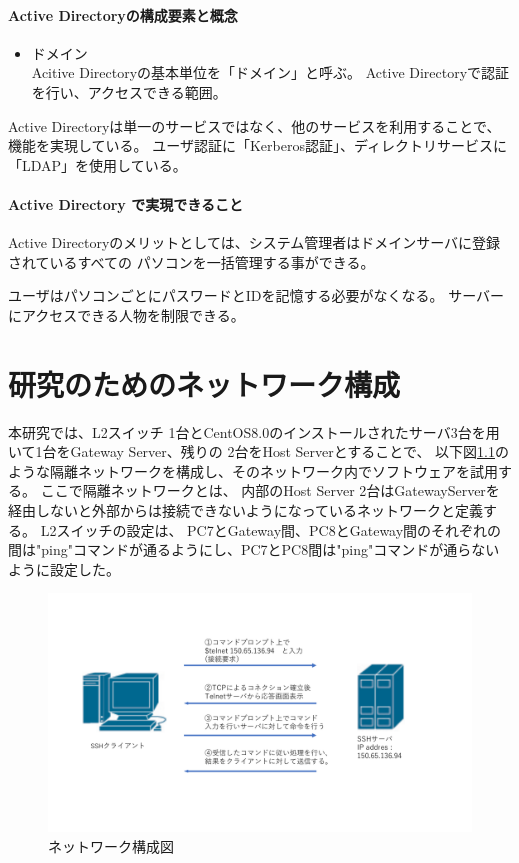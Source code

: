 \documentclass[11pt,a4j,titlepage]{jreport}
\begin{document}

\subsubsection*{Active Directoryの構成要素と概念}

\begin{itemize}
    \item ドメイン\mbox{}\\
    Acitive Directoryの基本単位を「ドメイン」と呼ぶ。
    Active Directoryで認証を行い、アクセスできる範囲。

\end{itemize}
Active Directoryは単一のサービスではなく、他のサービスを利用することで、機能を実現している。
ユーザ認証に「Kerberos認証」、ディレクトリサービスに「LDAP」を使用している。


\subsubsection*{Active Directory で実現できること}
Active Directoryのメリットとしては、システム管理者はドメインサーバに登録されているすべての
パソコンを一括管理する事ができる。

ユーザはパソコンごとにパスワードとIDを記憶する必要がなくなる。
サーバーにアクセスできる人物を制限できる。


\fi


\chapter{研究のためのネットワーク構成}
本研究では、L2スイッチ 1台とCentOS8.0のインストールされたサーバ3台を用いて1台をGateway Server、残りの
2台をHost Serverとすることで、
以下図\ref{network_graph}のような隔離ネットワークを構成し、そのネットワーク内でソフトウェアを試用する。
ここで隔離ネットワークとは、
内部のHost Server 2台はGatewayServerを経由しないと外部からは接続できないようになっているネットワークと定義する。
L2スイッチの設定は、
PC7とGateway間、PC8とGateway間のそれぞれの間は"ping"コマンドが通るようにし、PC7とPC8間は"ping"コマンドが通らないように設定した。

\begin{figure}[H]
    \centering
    \includegraphics*[width=1.0\textwidth,page=2]{graphs/network_archtecture.pdf}
    \caption{ネットワーク構成図}
    \label{network_graph}
\end{figure}
\end{document}
